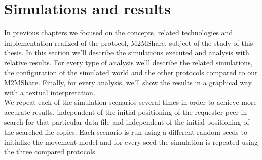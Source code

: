 
\chapter{Simulations and results}\label{simulazione} %





In previous chapters we focused on the concepts, related technologies and implementation realized of the protocol, M2MShare, subject of the study of this thesis. In this section we'll describe the simulations executed and analysis with relative results. For every type of analysis we'll describe the related simulations, the configuration of the simulated world and the other protocols compared to our M2MShare. Finally, for every analysis, we'll show the results in a graphical way with a textual interpretation.
\\

We repeat each of the simulation scenarios several times in order to achieve more accurate results, independent of the initial positioning of the requester peer in search for that particular data file and independent of the initial positioning of the searched file copies. Each scenario is run using a different random seeds to initialize the movement model and for every seed the simulation is repeated using the three compared protocols.

